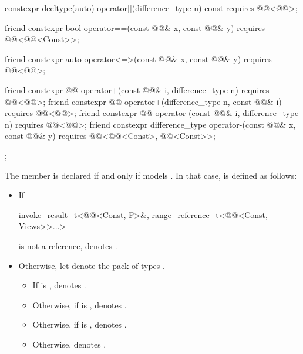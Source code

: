\begin{codeblock}
{{    constexpr decltype(auto) operator[](difference_type n) const
      requires @@<@@>;

    friend constexpr bool operator==(const @@& x, const @@& y)
      requires @@<@@<Const>>;

    friend constexpr auto operator<=>(const @@& x, const @@& y)
      requires @@<@@>;

    friend constexpr @@ operator+(const @@& i, difference_type n)
      requires @@<@@>;
    friend constexpr @@ operator+(difference_type n, const @@& i)
      requires @@<@@>;
    friend constexpr @@ operator-(const @@& i, difference_type n)
      requires @@<@@>;
    friend constexpr difference_type operator-(const @@& x, const @@& y)
      requires @@<@@<Const>, @@<Const>>;
  };
}
\end{codeblock}

\pnum
The member 
is declared if and only if  models .
In that case,
 is defined as follows:
\begin{itemize}
\item
If
\begin{codeblock}
invoke_result_t<@@<Const, F>&, range_reference_t<@@<Const, Views>>...>
\end{codeblock}
is not a reference,
 denotes .
\item
Otherwise, let  denote the pack of types
.
\begin{itemize}
\item
If 
is ,
 denotes .
\item
Otherwise,
if 
is ,
 denotes .
\item
Otherwise,
if 
is ,
 denotes .
\item
Otherwise,  denotes .
\end{itemize}
\end{itemize}

